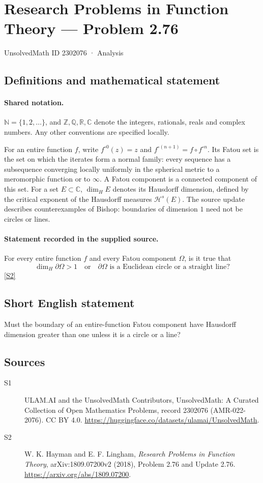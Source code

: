 \documentclass[11pt]{article}
\newcommand{\sref}[2]{\hyperlink{source:#1:#2}{[S#2]}}
\begin{document}
\setcounter{section}{2302075}
\section{Research Problems in Function Theory — Problem 2.76}\label{2302076}
{\small\sffamily UnsolvedMath ID 2302076 · Analysis}
\subsection{Definitions and mathematical statement}

\paragraph{Shared notation.}$\mathbb N=\{1,2,\ldots\}$, and $\mathbb Z,\mathbb Q,\mathbb R,\mathbb C$ denote the integers, rationals, reals and complex numbers. Any other conventions are specified locally.


For an entire function $f$, write $f^{\circ0}(z)=z$ and $f^{\circ(n+1)}=f\circ f^{\circ n}$. Its Fatou set is the set on which the iterates form a normal family: every sequence has a subsequence converging locally uniformly in the spherical metric to a meromorphic function or to $\infty$. A Fatou component is a connected component of this set. For a set $E\subset\mathbb C$, $\dim_H E$ denotes its Hausdorff dimension, defined by the critical exponent of the Hausdorff measures $\mathcal H^s(E)$.
The source update describes counterexamples of Bishop: boundaries of dimension $1$ need not be circles or lines.
\paragraph{Statement recorded in the supplied source.}
For every entire function $f$ and every Fatou component $\Omega$, is it true that
\[\dim_H\partial\Omega>1\quad\text{or}\quad\partial\Omega\text{ is a Euclidean circle or a straight line}?\] \sref{2302076}{2}
\subsection{Short English statement}
Must the boundary of an entire-function Fatou component have Hausdorff dimension greater than one unless it is a circle or a line?
\subsection{Sources}
\begin{description}
\item[\hypertarget{source:2302076:1}{S1}] ULAM.AI and the UnsolvedMath Contributors, UnsolvedMath: A Curated Collection of Open Mathematics Problems, record 2302076 (AMR-022-2076). CC BY 4.0. \url{https://huggingface.co/datasets/ulamai/UnsolvedMath}.
\item[\hypertarget{source:2302076:2}{S2}] W. K. Hayman and E. F. Lingham, \emph{Research Problems in Function Theory}, arXiv:1809.07200v2 (2018), Problem 2.76 and Update 2.76. \url{https://arxiv.org/abs/1809.07200}.
\end{description}
\label{end:2302076}
\end{document}
